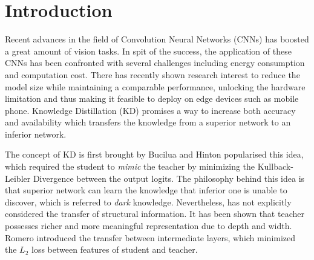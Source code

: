 \documentclass[10pt,twocolumn,letterpaper]{article}
\newcommand{\xd}[1]{\color{orange}{\tiny{$-$}#1}}
\begin{document}
\begin{abstract}
\end{abstract}

\section{Introduction}
\label{sec:intro}
Recent advances \cite{He2016DeepRL} in the field of Convolution Neural Networks (CNNs) has boosted a great amount of vision tasks. In spit of the success, the application of these CNNs has been confronted with several challenges including energy consumption and computation cost. There has recently shown research interest to reduce the model size while maintaining a comparable performance, unlocking the hardware limitation and thus making it feasible to deploy on edge devices such as mobile phone. Knowledge Distillation (KD) promises a way to increase both accuracy and availability which transfers the knowledge from a superior network to an inferior network. 

The concept of KD is first brought by Bucilua \etal \cite{bucilua2006model} and Hinton \etal \cite{Hinton2015DistillingTK} popularised this idea, which required the student to \textit{mimic} the teacher by minimizing the Kullback-Leibler Divergence between the output logits. The philosophy behind this idea is that superior network can learn the knowledge that inferior one is unable to discover, which is referred to \textit{dark} knowledge. Nevertheless, \cite{Hinton2015DistillingTK} has not explicitly considered the transfer of structural information. It has been shown that teacher possesses richer and more meaningful representation due to depth and width. Romero \etal \cite{Romero2015FitNetsHF} introduced the transfer between intermediate layers, which minimized the $L_2$ loss between features of student and teacher.
\end{document}
